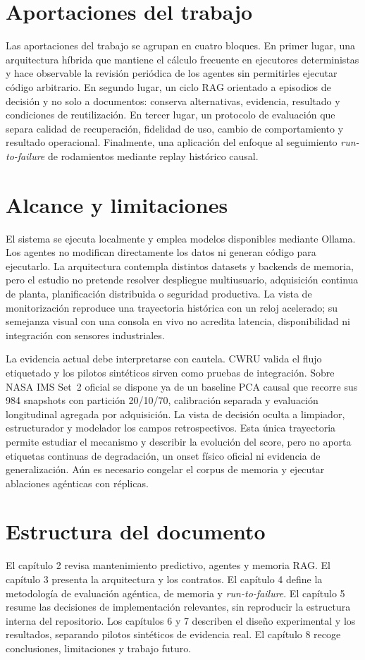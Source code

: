 \section{Aportaciones del trabajo}

Las aportaciones del trabajo se agrupan en cuatro bloques. En primer lugar, una
arquitectura híbrida que mantiene el cálculo frecuente en ejecutores
deterministas y hace observable la revisión periódica de los agentes sin
permitirles ejecutar código arbitrario. En segundo lugar, un ciclo RAG orientado
a episodios de decisión y no solo a documentos: conserva alternativas,
evidencia, resultado y condiciones de reutilización. En tercer lugar, un
protocolo de evaluación que separa calidad de recuperación, fidelidad de uso,
cambio de comportamiento y resultado operacional. Finalmente, una aplicación
del enfoque al seguimiento \textit{run-to-failure} de rodamientos mediante
replay histórico causal.

\section{Alcance y limitaciones}

El sistema se ejecuta localmente y emplea modelos disponibles mediante Ollama.
Los agentes no modifican directamente los datos ni generan código para
ejecutarlo. La arquitectura contempla distintos datasets y backends de memoria,
pero el estudio no pretende resolver despliegue multiusuario, adquisición
continua de planta, planificación distribuida o seguridad productiva. La vista
de monitorización reproduce una trayectoria histórica con un reloj acelerado;
su semejanza visual con una consola en vivo no acredita latencia, disponibilidad
ni integración con sensores industriales.

La evidencia actual debe interpretarse con cautela. CWRU valida el flujo
etiquetado y los pilotos sintéticos sirven como pruebas de integración. Sobre
NASA IMS Set~2 oficial se dispone ya de un baseline PCA causal que recorre sus
984 snapshots con partición 20/10/70, calibración separada y evaluación
longitudinal agregada por adquisición. La vista de decisión oculta a limpiador,
estructurador y modelador los campos retrospectivos. Esta única trayectoria
permite estudiar el mecanismo y describir la evolución del score, pero no
aporta etiquetas continuas de degradación, un onset físico oficial ni evidencia
de generalización. Aún es necesario congelar el corpus de memoria y ejecutar
ablaciones agénticas con réplicas.

\section{Estructura del documento}

El capítulo 2 revisa mantenimiento predictivo, agentes y memoria RAG\@. El
capítulo 3 presenta la arquitectura y los contratos. El capítulo 4 define la
metodología de evaluación agéntica, de memoria y \textit{run-to-failure}. El
capítulo 5 resume las decisiones de implementación relevantes, sin reproducir
la estructura interna del repositorio. Los capítulos 6 y 7 describen el diseño
experimental y los resultados, separando pilotos sintéticos de evidencia real.
El capítulo 8 recoge conclusiones, limitaciones y trabajo futuro.

